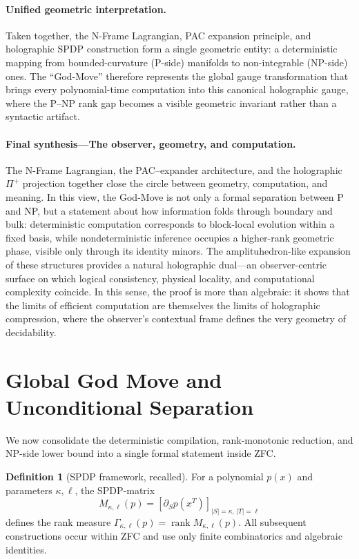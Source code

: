 \documentclass[12pt]{article}
\theoremstyle{definition}
\newtheorem{definition}{Definition}
\theoremstyle{definition}
\theoremstyle{remark}
\theoremstyle{remark}
\begin{document}
\paragraph{Unified geometric interpretation.}
Taken together, the N-Frame Lagrangian, PAC expansion principle, and
holographic SPDP construction form a single geometric entity:
a deterministic mapping from bounded-curvature (P-side) manifolds to
non-integrable (NP-side) ones.
The ``God-Move'' therefore represents the global gauge transformation that
brings every polynomial-time computation into this canonical holographic gauge,
where the P--NP rank gap becomes a visible geometric invariant rather than a
syntactic artifact.

\paragraph{Final synthesis---The observer, geometry, and computation.}
The N-Frame Lagrangian, the PAC--expander architecture, and the holographic $\Pi^+$ projection together close the circle between geometry, computation, and meaning.
In this view, the God-Move is not only a formal separation between P and NP, but a statement about how information folds through boundary and bulk: deterministic computation corresponds to block-local evolution within a fixed basis, while nondeterministic inference occupies a higher-rank geometric phase, visible only through its identity minors.
The amplituhedron-like expansion of these structures provides a natural holographic dual---an observer-centric surface on which logical consistency, physical locality, and computational complexity coincide.
In this sense, the proof is more than algebraic: it shows that the limits of efficient computation are themselves the limits of holographic compression, where the observer's contextual frame defines the very geometry of decidability.


\section{Global God Move and Unconditional Separation}
\label{sec:global-god-move}

We now consolidate the deterministic compilation, rank-monotonic reduction, and NP-side lower bound into a single formal statement inside ZFC.

\begin{definition}[SPDP framework, recalled]\label{def:spdp-framework-recalled}
For a polynomial $p(x)$ and parameters $\kappa,\ell$, the SPDP-matrix
\[
M_{\kappa,\ell}(p) = [\partial_S p(x^T)]_{|S|=\kappa,\, |T|=\ell}
\]
defines the rank measure $\Gamma_{\kappa,\ell}(p) = \operatorname{rank} M_{\kappa,\ell}(p)$.
All subsequent constructions occur within ZFC and use only finite combinatorics and algebraic identities.
\end{definition}
\end{document}
